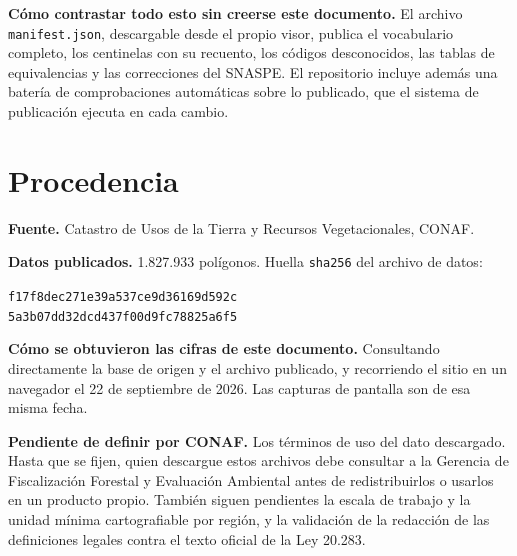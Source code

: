 \documentclass[11pt,a4paper]{report}
\newcommand{\campo}[1]{\textcolor{conaf}{\textbf{#1}}}
\newcommand{\orig}[1]{\texttt{\small #1}}
\begin{document}
\begin{nota}
\campo{Cómo contrastar todo esto sin creerse este documento.} El archivo
\orig{manifest.json}, descargable desde el propio visor, publica el vocabulario
completo, los centinelas con su recuento, los códigos desconocidos, las tablas
de equivalencias y las correcciones del SNASPE. El repositorio incluye además
una batería de comprobaciones automáticas sobre lo publicado, que el sistema de
publicación ejecuta en cada cambio.
\end{nota}

\chapter*{Procedencia}

\campo{Fuente.} Catastro de Usos de la Tierra y Recursos Vegetacionales, CONAF.

\campo{Datos publicados.} 1.827.933 polígonos. Huella \orig{sha256} del archivo
de datos:

\begin{center}
\orig{f17f8dec271e39a537ce9d36169d592c}\\
\orig{5a3b07dd32dcd437f00d9fc78825a6f5}
\end{center}

\campo{Cómo se obtuvieron las cifras de este documento.} Consultando
directamente la base de origen y el archivo publicado, y recorriendo el sitio en
un navegador el 22 de septiembre de 2026. Las capturas de pantalla son de esa
misma fecha.

\begin{alerta}
\campo{Pendiente de definir por CONAF.} Los términos de uso del dato descargado.
Hasta que se fijen, quien descargue estos archivos debe consultar a la Gerencia
de Fiscalización Forestal y Evaluación Ambiental antes de redistribuirlos o
usarlos en un producto propio. También siguen pendientes la escala de trabajo y
la unidad mínima cartografiable por región, y la validación de la redacción de
las definiciones legales contra el texto oficial de la Ley 20.283.
\end{alerta}
\end{document}
